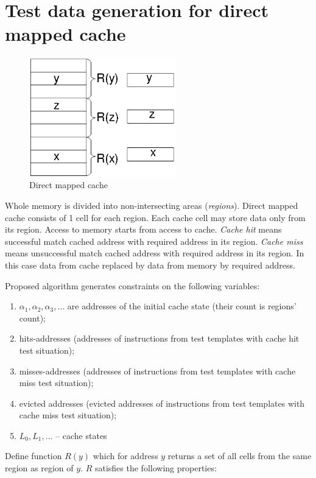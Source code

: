\section{Test data generation for direct mapped cache}

\begin{figure}[h]
\centering
\includegraphics[width=2.5in]{prm}
\caption{Direct mapped cache} \label{prm_pic}
\end{figure}

Whole memory is divided into non-intersecting areas
(\emph{regions}). Direct mapped cache consists of 1 cell for each
region. Each cache cell may store data only from its region. Access
to memory starts from access to cache. \emph{Cache hit} means
successful match cached address with required address in its region.
\emph{Cache miss} means unsuccessful match cached address with
required address in its region. In this case data from cache
replaced by data from memory by required address.

Proposed algorithm generates constraints on the following variables:
\begin{enumerate}
\item $\alpha_1, \alpha_2, \alpha_3,...$ are addresses of the initial
cache state (their count is regions' count);
\item hits-addresses (addresses of instructions from test templates
with cache hit test situation);
\item misses-addresses (addresses of instructions from test templates
with cache miss test situation);
\item evicted addresses (evicted addresses of instructions from test templates
with cache miss test situation);
\item $L_0, L_1, ...$ -- cache states
\end{enumerate}

Define function $R(y)$ which for address $y$ returns a set of all
cells from the same region as region of $y$. $R$ satisfies the
following properties:

